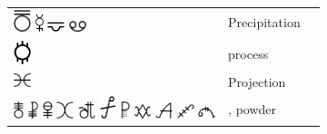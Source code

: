\documentclass[british,final,landscape]{scrartcl}
\begin{document}
\begin{refsection}
\begin{supertabular}{p{0.3\textwidth}p{0.34\textwidth}p{0.34\textwidth}}
   \includegraphics[width=5mm]{Process/Precipitation1} \includegraphics[height=5mm]{Process/Precipitation2} \includegraphics[width=5mm]{Process/Precipitation3} \includegraphics[width=5mm]{Process/Precipitation4} & Precipitation & \\
   \includegraphics[width=5mm]{Process/Process} & process & \\
   \includegraphics[width=5mm]{Process/Projection} & Projection & \\
   \includegraphics[height=5mm]{Process/Powder} \includegraphics[height=5mm]{Process/Powder2} \includegraphics[height=5mm]{Process/Powder3} \includegraphics[width=5mm]{Process/Powder4} \includegraphics[width=5mm]{Process/Powder5} \includegraphics[width=5mm]{Process/Powder6} \includegraphics[height=5mm]{Process/Powder7} \includegraphics[width=5mm]{Process/Powder8} \includegraphics[width=5mm]{Process/Powder9} \includegraphics[width=5mm]{Process/Powder10} \includegraphics[width=5mm]{Process/Powder11} & , powder & \\

\end{supertabular}
\end{refsection}
\end{document}
